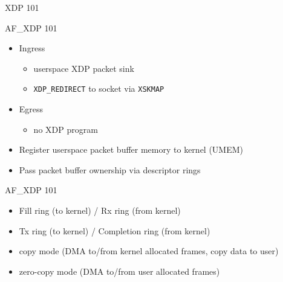 \documentclass[aspectratio=169]{beamer}
\begin{document}
  \begin{frame}{XDP 101}
    \centering{}
  \end{frame}

  \begin{frame}{AF\_XDP 101}
    \begin{itemize}
    \item Ingress
      \begin{itemize}
      \item userspace XDP packet sink
      \item {\tt XDP\_REDIRECT} to socket via {\tt XSKMAP}
      \end{itemize}
    \item Egress
      \begin{itemize}
      \item no XDP program
      \end{itemize}
    \item Register userspace packet buffer memory to kernel (UMEM)
    \item Pass packet buffer ownership via descriptor rings
    \end{itemize}
  \end{frame}

  \begin{frame}{AF\_XDP 101}
    \centering{}
    \begin{itemize}
    \item Fill ring (to kernel) / Rx ring (from kernel)
    \item Tx ring (to kernel) / Completion ring (from kernel)
    \item copy mode (DMA to/from kernel allocated frames, copy data to user)
    \item zero-copy mode (DMA to/from user allocated frames)
    \end{itemize}
  \end{frame}
\end{document}
